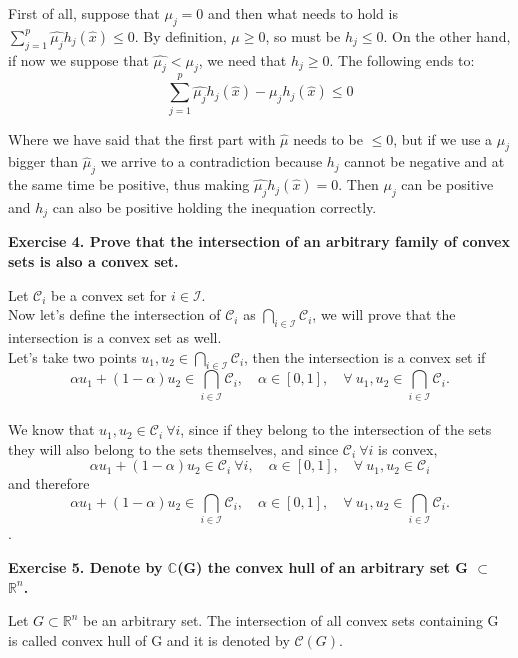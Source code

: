 \documentclass[12pt,letterpaper]{article}
\theoremstyle{definition}
\begin{document}
First of all, suppose that $\mu_j = 0$ and then what needs to hold is $\sum_{j=1}^{p} \hat{\mu_j}h_j(\hat{x}) \leq 0$. By definition, $\mu \geq 0$, so must be $h_j \leq 0$. On the other hand, if now we suppose that $\hat{\mu_j} < \mu_j$, we need that $h_j \geq 0$. The following ends to:
$$\sum_{j=1}^{p} \hat{\mu_j}h_j(\hat{x})-\mu_j h_j(\hat{x}) \leq 0$$

Where we have said that the first part with $\hat{\mu}$ needs to be $\leq 0$, but if we use a $\mu_j$ bigger than $\hat{\mu}_j$ we arrive to a contradiction because $h_j$ cannot be negative and at the same time be positive, thus making $\hat{\mu_j}h_j(\hat{x}) = 0$. Then $\mu_j$ can be positive and $h_j$ can also be positive holding the inequation correctly.



\textbf{Exercise 4. Prove that the intersection of an arbitrary family of convex sets is also a convex set.} 

Let $\mathcal{C}_i$ be a convex set for $i \in \mathcal{I} $.
\\ 
Now let's define the intersection of $\mathcal{C}_i $ as $\bigcap_{i \in \mathcal{I}} \mathcal{C}_i$, we will prove that the intersection is a convex set as well.
\\
Let's take two points $u_1, u_2 \in \bigcap_{i \in \mathcal{I}} \mathcal{C}_i$, then the intersection is a convex set if 
$$
\alpha u_1 + (1- \alpha) u_2 \in \bigcap_{i \in \mathcal{I}} \mathcal{C}_i, \quad \alpha \in [0, 1], \quad \forall \ u_1, u_2 \in \bigcap_{i \in \mathcal{I}} \mathcal{C}_i.
$$
\\
We know that $u_1, u_2 \in \mathcal{C}_i \ \forall i$, since if they belong to the intersection of the sets they will also belong to the sets themselves, and since $\mathcal{C}_i \ \forall i$ is convex, 
$$
\alpha u_1 + (1- \alpha) u_2 \in \mathcal{C}_i \ \forall i, \quad \alpha \in [0, 1], \quad \forall \ u_1, u_2 \in \mathcal{C}_i
$$
and therefore
$$
\alpha u_1 + (1- \alpha) u_2 \in \bigcap_{i \in \mathcal{I}} \mathcal{C}_i, \quad \alpha \in [0, 1], \quad \forall \ u_1, u_2 \in \bigcap_{i \in \mathcal{I}} \mathcal{C}_i.
$$.


\textbf{Exercise 5. Denote by $\mathbb{C}$(G) the convex hull of an arbitrary set G $\subset$ $\mathbb{R}^n$.}

    
    Let $G \subset \mathbb{R}^n$ be an arbitrary set. The intersection of all convex sets containing G is called convex hull of G and it is denoted by $\mathcal{C}(G)$.
    
\end{document}
